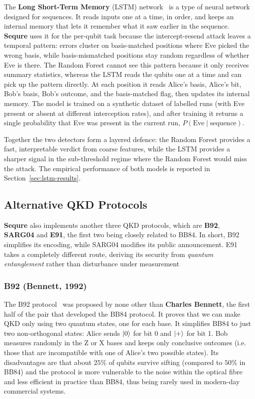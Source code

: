 \documentclass[12pt, a4paper]{article}
\begin{document}
The \textbf{Long Short-Term Memory} (LSTM) network~\cite{hochreiter1997} is a type of neural network designed for sequences. It reads inputs one at a time, in order, and keeps an internal memory that lets it remember what it saw
earlier in the sequence. \textbf{Sequre} uses it for the per-qubit task because the intercept-resend attack leaves a temporal pattern: errors cluster on basis-matched positions where Eve picked the wrong basis, while basis-mismatched positions stay random regardless of whether Eve is there. The Random Forest cannot see this pattern because it only receives summary statistics, whereas the LSTM reads the qubits one at a time and can pick up the pattern directly. At each position it reads Alice's basis, Alice's bit, Bob's basis, Bob's outcome, and the basis-matched flag, then updates its internal memory. The model is trained on a synthetic dataset of labelled runs (with Eve present or absent at different interception rates), and after training it returns a single probability that Eve was present in the current run, $P(\text{Eve} \mid \text{sequence})$.


Together the two detectors form a layered defence: the Random
Forest provides a fast, interpretable verdict from coarse
features, while the LSTM provides a sharper signal in the
sub-threshold regime where the Random Forest would miss the
attack. The empirical performance of both models is reported in
Section~\ref{sec:lstm-results}.


\subsection{Alternative QKD Protocols}
\label{sec:alt-protocols}

\textbf{Sequre} also implements another three QKD protocols, which are \textbf{B92}, \textbf{SARG04} and \textbf{E91}, the first two being closely related to BB84. In short, B92 simplifies its encoding, while SARG04 modifies its public announcement. E91 takes a completely different route, deriving its security from \textit{quantum entanglement} rather than disturbance under measurement

\subsubsection{B92 (Bennett, 1992)}
\label{sec:b92}

The B92 protocol~\cite{b92} was proposed by none other than \textbf{Charles Bennett}, the first half of the pair that developed the BB84 protocol. It proves that we can make QKD only using two quantum states, one for each base. It simplifies BB84 to just two non-orthogonal states: Alice sends $\ket{0}$ for bit 0 and $\ket{+}$ for bit 1. Bob measures randomly in the Z or X bases and keeps only conclusive outcomes (i.e. those that are incompatible with one of Alice's two possible states). Its disadvantages are that about $25\%$ of qubits survive sifting (compared to $50\%$ in BB84) and the protocol is more vulnerable to the noise within the optical fibre and less efficient in practice than BB84, thus being rarely used in modern-day commercial systems.
\end{document}
